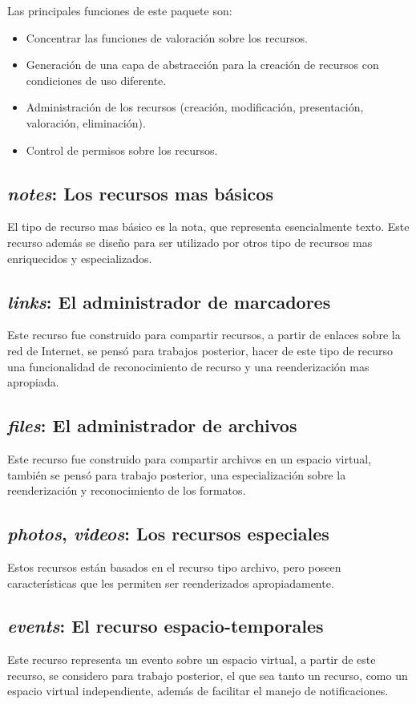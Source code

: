 Las principales funciones de este paquete son:

\begin{itemize}
\item Concentrar las funciones de valoración sobre los recursos.
\item Generación de una capa de abstracción para la creación de recursos con
condiciones de uso diferente.
\item Administración de los recursos (creación, modificación, presentación,
valoración, eliminación).
\item Control de permisos sobre los recursos.
\end{itemize}

\subsection{\emph{notes}: Los recursos mas básicos}
El tipo de recurso mas básico es la nota, que representa esencialmente texto.
Este recurso además se diseño para ser utilizado por otros tipo de recursos mas
enriquecidos y especializados.

\subsection{\emph{links}: El administrador de marcadores}
Este recurso fue construido para compartir recursos, a partir de enlaces sobre
la red de Internet, se pensó para trabajos posterior, hacer de este tipo de
recurso una funcionalidad de reconocimiento de recurso y una reenderización mas
apropiada.

\subsection{\emph{files}: El administrador de archivos}
Este recurso fue construido para compartir archivos en un espacio virtual,
también se pensó para trabajo posterior, una especialización sobre la
reenderización y reconocimiento de los formatos.

\subsection{\emph{photos}, \emph{videos}: Los recursos especiales}
Estos recursos están basados en el recurso tipo archivo, pero poseen
características que les permiten ser reenderizados apropiadamente.

\subsection{\emph{events}: El recurso espacio-temporales}
Este recurso representa un evento sobre un espacio virtual, a partir de este
recurso, se considero para trabajo posterior, el que sea tanto un recurso, como
un espacio virtual independiente, además de facilitar el manejo de
notificaciones.

